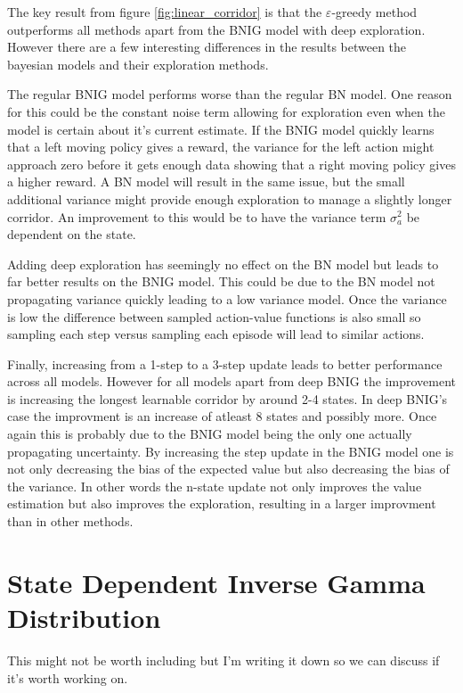 The key result from figure \ref{fig:linear_corridor} is that the $\varepsilon$-greedy method outperforms all methods apart from the BNIG model with deep exploration. However there are a few interesting differences in the results between the bayesian models and their exploration methods. 

The regular BNIG model performs worse than the regular BN model. One reason for this could be the constant noise term allowing for exploration even when the model is certain about it's current estimate. If the BNIG model quickly learns that a left moving policy gives a reward, the variance for the left action might approach zero before it gets enough data showing that a right moving policy gives a higher reward. A BN model will result in the same issue, but the small additional variance might provide enough exploration to manage a slightly longer corridor. An improvement to this would be to have the variance term $\sigma_a^2$ be dependent on the state.

Adding deep exploration has seemingly no effect on the BN model but leads to far better results on the BNIG model. This could be due to the BN model not propagating variance quickly leading to a low variance model. Once the variance is low the difference between sampled action-value functions is also small so sampling each step versus sampling each episode will lead to similar actions.

Finally, increasing from a 1-step to a 3-step update leads to better performance across all models. However for all models apart from deep BNIG the improvement is increasing the longest learnable corridor by around 2-4 states. In deep BNIG's case the improvment is an increase of atleast 8 states and possibly more. Once again this is probably due to the BNIG model being the only one actually propagating uncertainty. By increasing the step update in the BNIG model one is not only decreasing the bias of the expected value but also decreasing the bias of the variance. In other words the n-state update not only improves the value estimation but also improves the exploration, resulting in a larger improvment than in other methods.



\section{\color{red}{Temp?} \color{black} State Dependent Inverse Gamma Distribution}

\todo This might not be worth including but I'm writing it down so we can discuss if it's worth working on.

